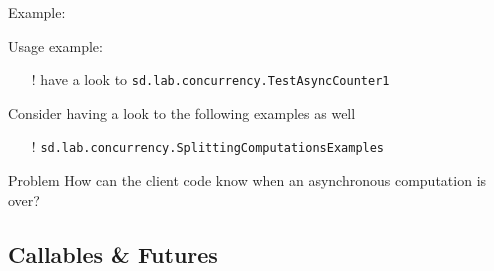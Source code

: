 \documentclass{beamer}\mode<presentation>{\usetheme{AMSBolognaFC}}
\begin{document}
\begin{frame}[allowframebreaks]
    \framebreak

    Example:
	

    \framebreak

    Usage example:
    
    \begin{itemize}
        \item[!] have a look to \texttt{sd.lab.concurrency.\alert{TestAsyncCounter1}}
    \end{itemize}

    \framebreak

    Consider having a look to the following examples as well
    \begin{itemize}
        \item[!] \texttt{sd.lab.concurrency.\alert{SplittingComputationsExamples}}
    \end{itemize}

    \framebreak

    \begin{alertblock}{Problem}\centering
        How can the client code know when an asynchronous computation is over?
    \end{alertblock}

\end{frame}

\subsection{Callables \& Futures}
\end{document}
